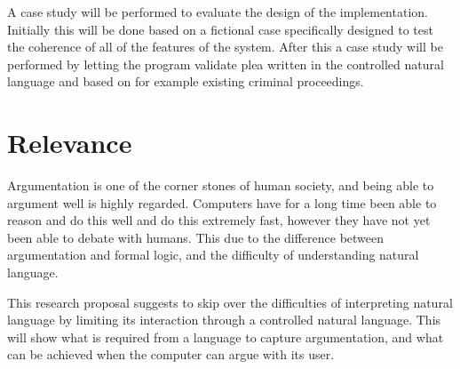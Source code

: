 \documentclass[a4paper]{article}
\begin{document}
A case study will be performed to evaluate the design of the implementation. Initially this will be done based on a fictional case specifically designed to test the coherence of all of the features of the system. After this a case study will be performed by letting the program validate plea written in the controlled natural language and based on for example existing criminal proceedings.



\section*{Relevance}
Argumentation is one of the corner stones of human society, and being able to argument well is highly regarded. Computers have for a long time been able to reason and do this well and do this extremely fast, however they have not yet been able to debate with humans. This due to the difference between argumentation and formal logic, and the difficulty of understanding natural language.

This research proposal suggests to skip over the difficulties of interpreting natural language by limiting its interaction through a controlled natural language. This will show what is required from a language to capture argumentation, and what can be achieved when the computer can argue with its user.
\end{document}
